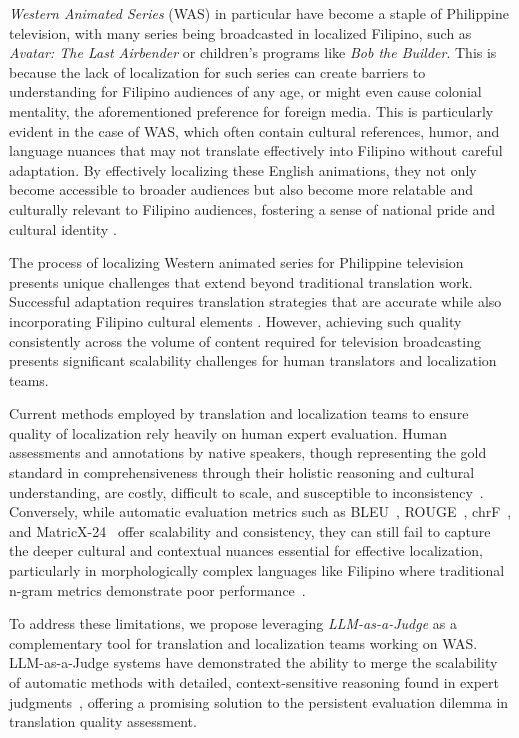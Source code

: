 \documentclass[conference]{IEEEtran}
\begin{document}
\textit{Western Animated Series} (WAS) in particular have become a staple of Philippine television, with many series being broadcasted in localized Filipino, such as \textit{Avatar: The Last Airbender} or children's programs like \textit{Bob the Builder}. This is because the lack of localization for such series can create barriers to understanding for Filipino audiences of any age, or might even cause colonial mentality, the aforementioned preference for foreign media. This is particularly evident in the case of WAS, which often contain cultural references, humor, and language nuances that may not translate effectively into Filipino without careful adaptation. By effectively localizing these English animations, they not only become accessible to broader audiences but also become more relatable and culturally relevant to Filipino audiences, fostering a sense of national pride and cultural identity \cite{correa_japanimation_2007,marquez_halo-hallyung_2025}.

The process of localizing Western animated series for Philippine television presents unique challenges that extend beyond traditional translation work. Successful adaptation requires translation strategies that are accurate while also incorporating Filipino cultural elements \cite{marquez_halo-hallyung_2025}. However, achieving such quality consistently across the volume of content required for television broadcasting presents significant scalability challenges for human translators and localization teams.

Current methods employed by translation and localization teams to ensure quality of localization rely heavily on human expert evaluation. Human assessments and annotations by native speakers, though representing the gold standard in comprehensiveness through their holistic reasoning and cultural understanding, are costly, difficult to scale, and susceptible to inconsistency~\cite{gu_survey_2025}. Conversely, while automatic evaluation metrics such as BLEU~\cite{papineni_bleu_2001}, ROUGE~\cite{lin_rouge_2004}, chrF~\cite{popovic_chrf_2015}, and MatricX-24~\cite{juraska_metricx-24_2024} offer scalability and consistency, they can still fail to capture the deeper cultural and contextual nuances essential for effective localization, particularly in morphologically complex languages like Filipino where traditional n-gram metrics demonstrate poor performance~\cite{baliber_bridging_2020}.

To address these limitations, we propose leveraging \textit{LLM-as-a-Judge} as a complementary tool for translation and localization teams working on WAS. LLM-as-a-Judge systems have demonstrated the ability to merge the scalability of automatic methods with detailed, context-sensitive reasoning found in expert judgments~\cite{gu_survey_2025}, offering a promising solution to the persistent evaluation dilemma in translation quality assessment.
\end{document}
